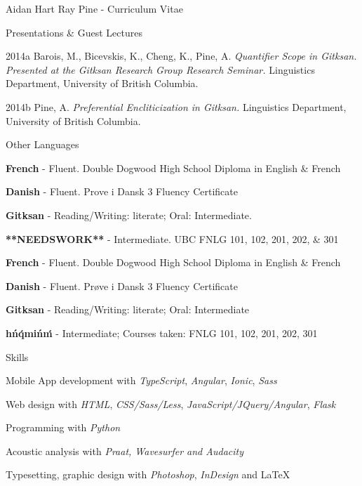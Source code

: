 \documentclass[12pt]{letter}
\begin{document}
\begin{cv}{ Aidan Hart Ray Pine  \space - \space   Curriculum Vitae}
\begin{cvlist}{Presentations \& Guest Lectures}
            \item[2014a] Barois, M., Bicevskis, K., Cheng, K., Pine, A.
            \textit{Quantifier Scope in Gitksan. Presented at the Gitksan Research Group Research Seminar.} Linguistics Department, University of British Columbia. 
            
            \item[2014b] Pine, A. \textit{Preferential Encliticization in Gitksan.} \newline Linguistics Department, University of British Columbia.
            
        \end{cvlist}
        \begin{cvlist}{Other Languages}
                            \item \textbf{French} - Fluent. Double Dogwood High School Diploma in English & French
                            \item \textbf{Danish} - Fluent. Prove i Dansk 3 Fluency Certificate
                            \item \textbf{Gitksan} - Reading/Writing: literate; Oral: Intermediate. 
                            \item \textbf{**NEEDSWORK**} - Intermediate. UBC FNLG 101, 102, 201, 202, & 301
                        \item \textbf{French} - Fluent. Double Dogwood High School Diploma in English \& French
            \item \textbf{Danish} - Fluent. Pr\o ve i Dansk 3 Fluency Certificate
            \item \textbf{Gitksan} - Reading/Writing: literate; Oral: Intermediate 
            \item \textbf{h\textschwa \'n\'q\textschwa mi\'n\textschwa \'m} - Intermediate; Courses taken: FNLG 101, 102, 201, 202, 301	
        \end{cvlist}
         \begin{cvlist}{Skills}
             \item Mobile App development with \textit{TypeScript}, \textit{Angular}, \textit{Ionic}, \textit{Sass} 
             \item Web design with \textit{HTML}, \textit{CSS/Sass/Less}, \textit{JavaScript/JQuery/Angular}, \textit{Flask}
             \item Programming with \textit{Python}
             \item Acoustic analysis with \textit{Praat, Wavesurfer and Audacity}
            \item Typesetting, graphic design with \textit{Photoshop}, \textit{InDesign} and \LaTeX

\end{cvlist}
\end{cv}
\end{document}

